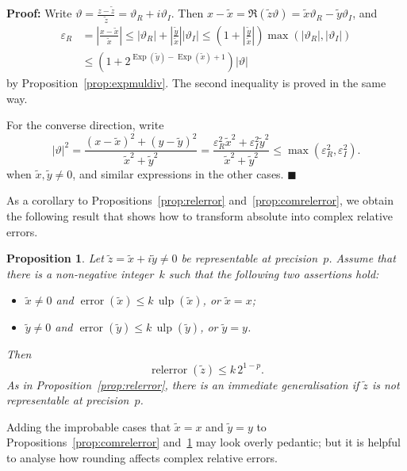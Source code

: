 \documentclass [11pt]{article}
\newcommand {\corr}[1]{{#1}}
\newcommand {\appro}[1]{\widetilde {#1}}
\newcommand {\Ulp}{{\operatorname {ulp}}}
\DeclareMathOperator{\Exp}{\operatorname {Exp}}
\newcommand{\error}{\operatorname {error}}
\newcommand{\relerror}{\operatorname {relerror}}
\renewcommand {\epsilon}{\varepsilon}
\renewcommand {\theta}{\vartheta}
\renewcommand {\leq}{\leqslant}
\newtheorem{prop}[theorem]{Proposition}
\newenvironment{proof}{\noindent \textbf {Proof:}}{{\hspace* {\fill}$\blacksquare$}}
\begin{document}
\begin {proof}
Write $\theta = \frac {\corr z - \appro z}{\appro z}
= \theta_R + i \theta_I$. Then
$\corr x - \appro x = \Re (\appro z \theta)
= \appro x \theta_R - \appro y \theta_I$, and
\begin {align*}
\epsilon_R
&= \left| \frac {\corr x - \appro x}{\appro x} \right|
\leq |\theta_R| + \left| \frac {\appro y}{\appro x} \right| |\theta_I|
\leq \left( 1 + \left| \frac {\appro y}{\appro x} \right| \right)
\max (|\theta_R|, |\theta_I|) \\
&\leq \left( 1 + 2^{\Exp (\appro y) - \Exp (\appro x) + 1} \right)
|\theta|
\end {align*}
by Proposition~\ref {prop:expmuldiv}. The second inequality is proved
in the same way.

For the converse direction, write
\[
|\theta|^2
= \frac {(\corr x - \appro x)^2 + (\corr y - \appro y)^2}{\appro x^2 + \appro y^2}
= \frac {\epsilon_R^2 \appro x^2 + \epsilon_I^2 \appro y^2}{\appro x^2 + \appro y^2}
\leq \max \left( \epsilon_R^2, \epsilon_I^2 \right).
\]
when $\appro x, \appro y \neq 0$, and similar expressions in the
other cases.
\end {proof}

As a corollary to Propositions~\ref {prop:relerror}
and~\ref {prop:comrelerror}, we obtain the following result that shows how
to transform absolute into complex relative errors.

\begin {prop}
\label {prop:comabstorelerror}
Let $\appro z = \appro x + i \appro y \neq 0$ be representable
at precision~$p$.
Assume that there is a non-negative integer~$k$ such that the following
two assertions hold:
\begin {itemize}
\item
$\appro x \neq 0$ and $\error (\appro x) \leq k \, \Ulp (\appro x)$,
or $\appro x = \corr x$;
\item
$\appro y \neq 0$ and $\error (\appro y) \leq k \, \Ulp (\appro y)$,
or $\appro y = \corr y$.
\end {itemize}
Then
\[
\relerror (\appro z) \leq k \, 2^{1-p}.
\]
As in Proposition~\ref {prop:relerror}, there is an immediate generalisation
if $\appro z$ is not representable at precision~$p$.
\end {prop}

Adding the improbable cases that $\appro x = \corr x$ and
$\appro y = \corr y$ to Propositions~\ref {prop:comrelerror}
and~\ref {prop:comabstorelerror} may look overly pedantic; but it is
helpful to analyse how rounding affects complex relative errors.
\end{document}
